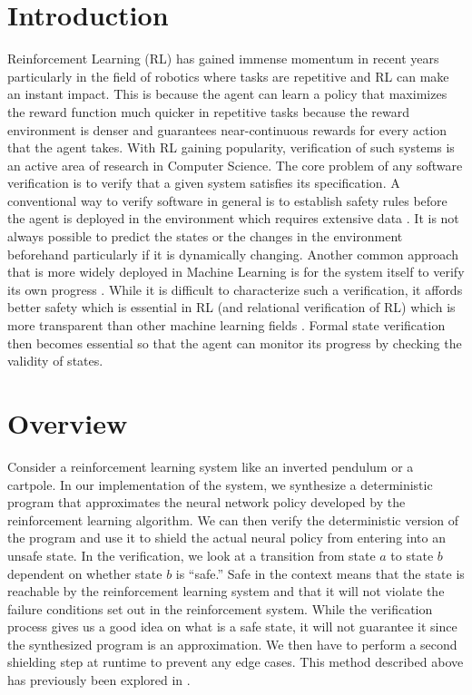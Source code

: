 \documentclass[11pt]{article}
\begin{document}
\section{Introduction}
Reinforcement Learning (RL) has gained immense momentum in recent years particularly in the field of robotics where tasks are repetitive and RL can make an instant impact. This is because the agent can learn a policy that maximizes the reward function much quicker in repetitive tasks because the reward environment is denser and guarantees near-continuous rewards for every action that the agent takes. With RL gaining popularity, verification of such systems is an active area of research in Computer Science. The core problem of any software verification is to verify that a given system satisfies its specification. A conventional way to verify software in general is to establish safety rules before the agent is deployed in the environment which requires extensive data \cite{gopinath:2017}. It is not always possible to predict the states or the changes in the environment beforehand particularly if it is dynamically changing. Another common approach that is more widely deployed in Machine Learning is for the system itself to verify its own progress \cite{zhu:2019,sun:2019}. While it is difficult to characterize such a verification, it affords better safety which is essential in RL (and relational verification of RL) which is more transparent than other machine learning fields \cite{verma:2018} . Formal state verification then becomes essential so that the agent can monitor its progress by checking the validity of states.

\section{Overview}
Consider a reinforcement learning system like an inverted pendulum or a cartpole. In our implementation of the system, we synthesize a deterministic program that approximates the neural network policy developed by the reinforcement learning algorithm. We can then verify the deterministic version of the program and use it to shield the actual neural policy from entering into an unsafe state. In the verification, we look at a transition from state $a$ to state $b$ dependent on whether state $b$ is ``safe.'' Safe in the context means that the state is reachable by the reinforcement learning system and that it will not violate the failure conditions set out in the reinforcement system. While the verification process gives us a good idea on what is a safe state, it will not guarantee it since the synthesized program is an approximation. We then have to perform a second shielding step at runtime to prevent any edge cases. This method described above has previously been explored in \cite{zhu:2019}. 
\end{document}
